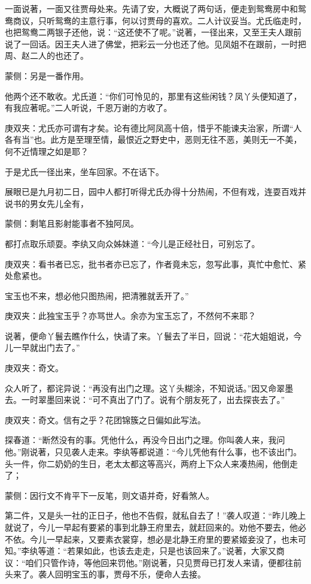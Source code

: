 \begin{parag}
    一面说著，一面又往贾母处来。先请了安，大概说了两句话，便走到鸳鸯房中和鸳鸯商议，只听鸳鸯的主意行事，何以讨贾母的喜欢。二人计议妥当。尤氏临走时，也把鸳鸯二两银子还他，说：“这还使不了呢。”说著，一径出来，又至王夫人跟前说了一回话。因王夫人进了佛堂，把彩云一分也还了他。见凤姐不在跟前，一时把周、赵二人的也还了。\begin{note}蒙侧：另是一番作用。\end{note}他两个还不敢收。尤氏道：“你们可怜见的，那里有这些闲钱？凤丫头便知道了，有我应著呢。”二人听说，千恩万谢的方收了。\begin{note}庚双夹：尤氏亦可谓有才矣。论有德比阿凤高十倍，惜乎不能谏夫治家，所谓“人各有当”也。此方是至理至情，最恨近之野史中，恶则无往不恶，美则无一不美，何不近情理之如是耶？\end{note}于是尤氏一径出来，坐车回家。不在话下。
\end{parag}


\begin{parag}
    展眼已是九月初二日，园中人都打听得尤氏办得十分热闹，不但有戏，连耍百戏并说书的男女先儿全有，\begin{note}蒙侧：剩笔且影射能事者不独阿凤。\end{note}都打点取乐顽耍。李纨又向众姊妹道：“今儿是正经社日，可别忘了。\begin{note}庚双夹：看书者已忘，批书者亦已忘了，作者竟未忘，忽写此事，真忙中愈忙、紧处愈紧也。\end{note}宝玉也不来，想必他只图热闹，把清雅就丢开了。”\begin{note}庚双夹：此独宝玉乎？亦骂世人。余亦为宝玉忘了，不然何不来耶？\end{note}说著，便命丫鬟去瞧作什么，快请了来。丫鬟去了半日，回说：“花大姐姐说，今儿一早就出门去了。”\begin{note}庚双夹：奇文。\end{note}众人听了，都诧异说：“再没有出门之理。这丫头糊涂，不知说话。”因又命翠墨去。一时翠墨回来说：“可不真出了门了。说有个朋友死了，出去探丧去了。”\begin{note}庚双夹：奇文。信有之乎？花团锦簇之日偏如此写法。\end{note}探春道：“断然没有的事。凭他什么，再没今日出门之理。你叫袭人来，我问他。”刚说著，只见袭人走来。李纨等都说道：“今儿凭他有什么事，也不该出门。头一件，你二奶奶的生日，老太太都这等高兴，两府上下众人来凑热闹，他倒走了；\begin{note}蒙侧：因行文不肯平下一反笔，则文语并奇，好看煞人。\end{note}第二件，又是头一社的正日子，他也不告假，就私自去了！”袭人叹道：“昨儿晚上就说了，今儿一早起有要紧的事到北静王府里去，就赶回来的。劝他不要去，他必不依。今儿一早起来，又要素衣裳穿，想必是北静王府里的要紧姬妾没了，也未可知。”李纨等道：“若果如此，也该去走走，只是也该回来了。”说著，大家又商议：“咱们只管作诗，等他回来罚他。”刚说著，只见贾母已打发人来请，便都往前头来了。袭人回明宝玉的事，贾母不乐，便命人去接。
\end{parag}


